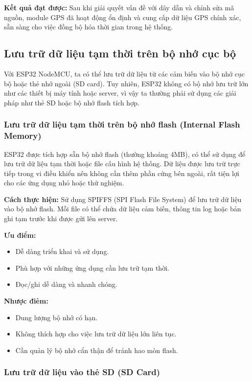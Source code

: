 \textbf{Kết quả đạt được:}  
Sau khi giải quyết vấn đề với dây dẫn và chỉnh sửa mã nguồn, module GPS đã hoạt động ổn định và cung cấp dữ liệu GPS chính xác, sẵn sàng cho việc đồng bộ hóa thời gian trong hệ thống.

\subsection{Lưu trữ dữ liệu tạm thời trên bộ nhớ cục bộ}

Với ESP32 NodeMCU, ta có thể lưu trữ dữ liệu từ các cảm biến vào bộ nhớ cục bộ hoặc thẻ nhớ ngoài (SD card). Tuy nhiên, ESP32 không có bộ nhớ lưu trữ lớn như các thiết bị máy tính hoặc server, vì vậy ta thường phải sử dụng các giải pháp như thẻ SD hoặc bộ nhớ flash tích hợp.

\subsubsection{Lưu trữ dữ liệu tạm thời trên bộ nhớ flash (Internal Flash Memory)}

ESP32 được tích hợp sẵn bộ nhớ flash (thường khoảng 4MB), có thể sử dụng để lưu trữ dữ liệu tạm thời hoặc file cấu hình hệ thống. Dữ liệu được lưu trữ trực tiếp trong vi điều khiển nên không cần thêm phần cứng bên ngoài, rất tiện lợi cho các ứng dụng nhỏ hoặc thử nghiệm.

\textbf{Cách thực hiện:} Sử dụng SPIFFS (SPI Flash File System) để lưu trữ dữ liệu vào bộ nhớ flash. Mỗi file có thể chứa dữ liệu cảm biến, thông tin log hoặc bản ghi tạm trước khi được gửi lên server.   

\textbf{Ưu điểm:}
\begin{itemize}
    \item Dễ dàng triển khai và sử dụng.
    \item Phù hợp với những ứng dụng cần lưu trữ tạm thời.
    \item Đọc/ghi dễ dàng và nhanh chóng.
\end{itemize}

\textbf{Nhược điẻm:}
\begin{itemize}
    \item Dung lượng bộ nhớ có hạn.
    \item Không thích hợp cho việc lưu trữ dữ liệu lớn liên tục.
    \item Cần quản lý bộ nhớ cẩn thận để tránh hao mòn flash.
\end{itemize}

\subsubsection{Lưu trữ dữ liệu vào thẻ SD (SD Card)}

